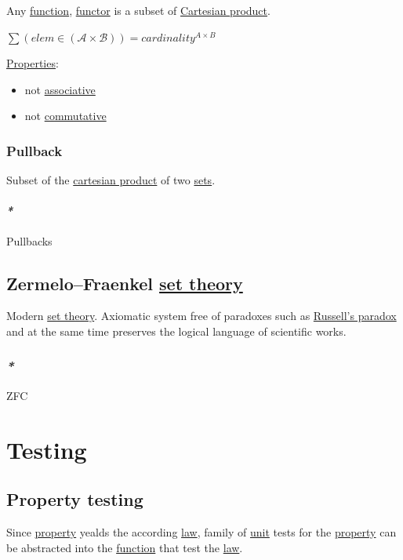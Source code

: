 \documentclass[a4paper,14pt,oneside]{book}
\begin{document}
Any \hyperref[orgf54a964]{function}, \hyperref[org56191fe]{functor} is a subset of \hyperref[orgc625abb]{Cartesian product}.

\(\sum{(elem \in (\mathcal{A} \times \mathcal{B}))}  = cardinality^{A \times B}\)

\hyperref[orgb42a88f]{Properties}:
\begin{itemize}
\item not \hyperref[orged21b43]{associative}
\item not \hyperref[org5dd1f95]{commutative}
\end{itemize}

\subsection{\label{orgd27c98f}Pullback}
\label{sec:orgb9f3165}
Subset of the \hyperref[orgc625abb]{cartesian product} of two \hyperref[org4a675d7]{sets}.

\subsubsection{\emph{*}}
\label{sec:org143f45d}
\label{orgf86f9cf}Pullbacks

\section{Zermelo–Fraenkel \hyperref[orgfd2fae4]{set theory}}
\label{sec:orgd00eac5}
Modern \hyperref[orgfd2fae4]{set theory}. Axiomatic system free of paradoxes such as \hyperref[org29b52d3]{Russell's paradox} and at the same time preserves the logical language of scientific works.

\subsection{\emph{*}}
\label{sec:org50a5a95}

\label{org737bf7e}ZFC

\chapter{\label{orgf0e202c}Testing}
\label{sec:org79d8369}
\section{\label{org741dbd3}Property testing}
\label{sec:org1383702}

Since \hyperref[orgbfedd9a]{property} yealds the according \hyperref[org0354a37]{law}, family of \hyperref[org0016cda]{unit} tests for the \hyperref[orgbfedd9a]{property} can be abstracted into the \hyperref[orgf54a964]{function} that test the \hyperref[org0354a37]{law}.
\end{document}
